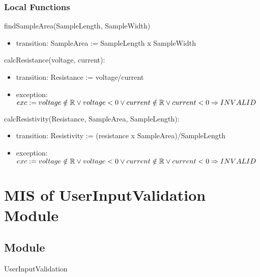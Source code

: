 \documentclass[12pt, titlepage]{article}
\begin{document}
\subsubsection{Local Functions}

findSampleArea(SampleLength, SampleWidth)
\begin{itemize}
  \item transition: SampleArea := SampleLength x SampleWidth
  \end{itemize}

  \noindent calcResistance(voltage, current):
  \begin{itemize}
  \item transition: Resistance := voltage/current 
  \item exception: $exc:= \\ 
  voltage \notin \mathbb{R} \lor voltage < 0 \\ 
  \lor current \notin \mathbb{R} \lor current < 0\\
   \Rightarrow INVALID$
  \end{itemize}
  
  \noindent calcResistivity(Resistance, SampleArea, SampleLength):
  \begin{itemize}
  \item transition: Resistivity := (resistance x SampleArea)/SampleLength
  \item exception: $exc:= \\ 
  voltage \notin \mathbb{R} \lor voltage < 0 \\ 
  \lor current \notin \mathbb{R} \lor current < 0\\
   \Rightarrow INVALID$
  \end{itemize}
\newpage

\section{MIS of UserInputValidation Module} \label{Module} 



\subsection{Module}

UserInputValidation
\end{document}

